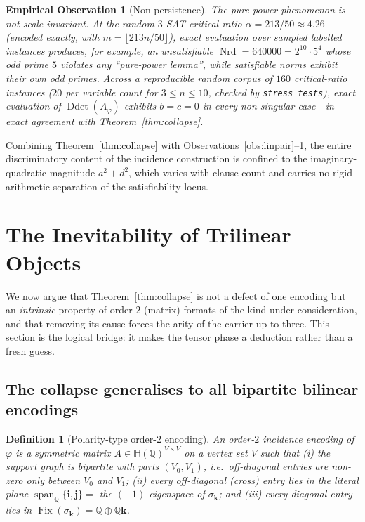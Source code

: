 \documentclass[pdflatex,sn-mathphys-num]{sn-jnl}
\theoremstyle{thmstyleone}%
\theoremstyle{thmstyletwo}%
\newtheorem{observation}[theorem]{Empirical Observation}%
\theoremstyle{thmstylethree}%
\newtheorem{definition}{Definition}%
\newcommand{\HH}{\mathbb{H}}
\newcommand{\QQ}{\mathbb{Q}}
\newcommand{\Nrd}{\operatorname{Nrd}}
\newcommand{\Ddet}{\operatorname{Ddet}}
\newcommand{\Fix}{\operatorname{Fix}}
\newcommand{\bi}{\mathbf{i}}
\newcommand{\bj}{\mathbf{j}}
\newcommand{\bk}{\mathbf{k}}
\newcommand{\Aphi}{A_{\varphi}}
\DeclareMathOperator{\spann}{span}
\begin{document}
\begin{observation}[Non-persistence]\label{obs:linscale}
The pure-power phenomenon is not scale-invariant. At the random-$3$-SAT
critical ratio $\alpha=213/50\approx4.26$ (encoded exactly, with
$m=\lfloor213n/50\rfloor$), exact evaluation over sampled labelled
instances produces, for example, an unsatisfiable
$\Nrd=640000=2^{10}\cdot5^{4}$ whose odd prime $5$ violates any
``pure-power lemma'', while satisfiable norms exhibit their own odd primes.
Across a reproducible random corpus of $160$ critical-ratio instances ($20$
per variable count for $3\le n\le10$, checked by \texttt{stress\_tests}),
exact evaluation of $\Ddet(\Aphi)$ exhibits $b=c=0$ in every non-singular
case---in exact agreement with Theorem~\ref{thm:collapse}.
\end{observation}

Combining Theorem~\ref{thm:collapse} with
Observations~\ref{obs:linpair}--\ref{obs:linscale}, the entire
discriminatory content of the incidence construction is confined to the
imaginary-quadratic magnitude $a^2+d^2$, which varies with clause count and
carries no rigid arithmetic separation of the satisfiability locus.

\newpage

\section{The Inevitability of Trilinear Objects}\label{sec:bridge}

We now argue that Theorem~\ref{thm:collapse} is not a defect of one
encoding but an \emph{intrinsic} property of order-$2$ (matrix) formats of
the kind under consideration, and that removing its cause forces the arity
of the carrier up to three. This section is the logical bridge: it makes the
tensor phase a deduction rather than a fresh guess.

\subsection{The collapse generalises to all bipartite bilinear encodings}

\begin{definition}[Polarity-type order-$2$ encoding]\label{def:order2}
An \emph{order-$2$ incidence encoding} of $\varphi$ is a symmetric matrix
$A\in\HH(\QQ)^{V\times V}$ on a vertex set $V$ such that (i) the support
graph is bipartite with parts $(V_0,V_1)$, i.e.\ off-diagonal entries are
non-zero only between $V_0$ and $V_1$; (ii) every off-diagonal (cross)
entry lies in the literal plane $\spann_\QQ\{\bi,\bj\}=$ the
$(-1)$-eigenspace of $\sigma_{\bk}$; and (iii) every diagonal entry lies in
$\Fix(\sigma_{\bk})=\QQ\oplus\QQ\bk$.
\end{definition}
\end{document}
